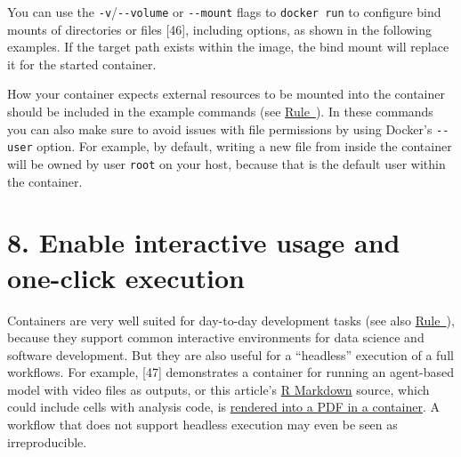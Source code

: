 \documentclass[10pt,letterpaper]{article}
\newenvironment{Shaded}{\begin{snugshade}}{\end{snugshade}}
\newcommand{\BuiltInTok}[1]{#1}
\newcommand{\CommentTok}[1]{\textcolor[rgb]{0.56,0.35,0.01}{\textit{#1}}}
\newcommand{\ExtensionTok}[1]{#1}
\newcommand{\NormalTok}[1]{#1}
\newcommand{\VariableTok}[1]{\textcolor[rgb]{0.00,0.00,0.00}{#1}}
\begin{document}
You can use the \texttt{-v}/\texttt{-\/-volume} or \texttt{-\/-mount}
flags to \texttt{docker\ run} to configure bind mounts of directories or
files {[}46{]}, including options, as shown in the following examples.
If the target path exists within the image, the bind mount will replace
it for the started container.

\footnotesize

\begin{Shaded}
\end{Shaded}

\normalsize

How your container expects external resources to be mounted into the
container should be included in the example commands (see
\hyperref[{rule:formatting}]{Rule~}). In
these commands you can also make sure to avoid issues with file
permissions by using Docker's \texttt{-\/-user} option. For example, by
default, writing a new file from inside the container will be owned by
user \texttt{root} on your host, because that is the default user within
the container.

\hypertarget{enable-interactive-usage-and-one-click-execution}{%
\section*{8. Enable interactive usage and one-click
execution}\label{enable-interactive-usage-and-one-click-execution}}

  \label{rule:interactive} 

Containers are very well suited for day-to-day development tasks (see
also \hyperref[{rule:usage}]{Rule~}), because they
support common interactive environments for data science and software
development. But they are also useful for a ``headless'' execution of a
full workflows. For example, {[}47{]} demonstrates a container for
running an agent-based model with video files as outputs, or this
article's \href{https://rmarkdown.rstudio.com/}{R Markdown} source,
which could include cells with analysis code, is
\href{https://github.com/nuest/ten-simple-rules-dockerfiles/blob/master/.travis.yml\#L18}{rendered
into a PDF in a container}. A workflow that does not support headless
execution may even be seen as irreproducible.
\end{document}
